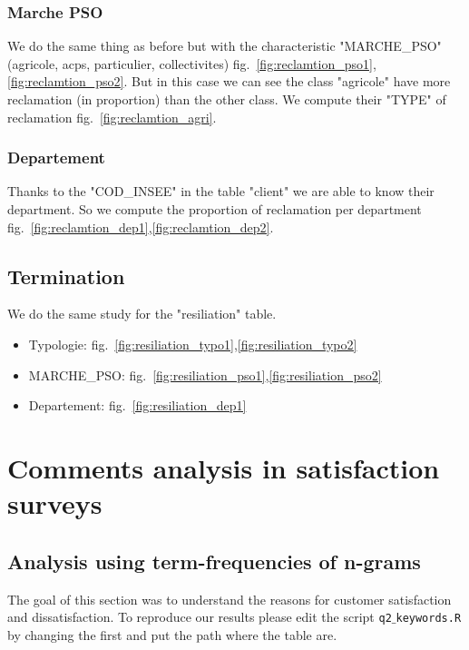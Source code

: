 \documentclass[a4paper, 11pt]{article}
\newcommand{\tw}[1]{\texttt{#1}}
\begin{document}
       \subsubsection{Marche PSO}
       		We do the same thing as before but with the characteristic "MARCHE\_PSO" (agricole, acps, particulier, collectivites) fig.~\ref{fig:reclamtion_pso1},\ref{fig:reclamtion_pso2}. But in this case we can see the class "agricole" have more reclamation (in proportion) than the other class. We compute their "TYPE" of reclamation fig.~\ref{fig:reclamtion_agri}. 
            
       \subsubsection{Departement}
       		Thanks to the "COD\_INSEE" in the table "client" we are able to know their department. So we compute the proportion of reclamation per department fig.~\ref{fig:reclamtion_dep1},\ref{fig:reclamtion_dep2}. 
            
       \subsection{Termination}
       		We do the same study for the "resiliation" table.
            \begin{itemize}
            \item Typologie: fig.~\ref{fig:resiliation_typo1},\ref{fig:resiliation_typo2}
            \item MARCHE\_PSO: fig.~\ref{fig:resiliation_pso1},\ref{fig:resiliation_pso2}
            \item Departement: fig.~\ref{fig:resiliation_dep1}
            \end{itemize}

\section{Comments analysis in satisfaction surveys}
\label{sec:com_anal}
    \subsection{Analysis using term-frequencies of n-grams}
        The goal of this section was to understand the reasons for customer satisfaction and dissatisfaction. To reproduce our results please edit the script \tw{q2$\_$keywords.R} by changing the first and put the path where the table are.
\end{document}
